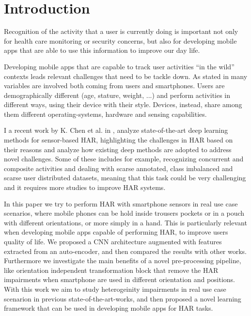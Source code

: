 
\section{Introduction}
\label{sec:introduction}

Recognition of the activity that a user is currently doing is
important not only for health care monitoring or security concerns,
but also for developing mobile apps that are able to use this
information to improve our day life.

Developing mobile apps that are capable to track user activities ``in
the wild'' contexts leads relevant challenges that need to be tackle
down. As stated in \cite{blunck2013heterogeneity} many variables are
involved both coming from users and smartphones. Users are
demographically different (age, stature, weight, ...) and perform
activities in different ways, using their device with their
style. Devices, instead, share among them different operating-systems,
hardware and sensing capabilities.

I a recent work by K. Chen et al. in \cite{chen2020deep}, analyze state-of-the-art
deep learning methods for sensor-based HAR, highlighting the
challenges in HAR based on their reasons and analyze how existing deep
methods are adopted to address novel challenges. Some of these
includes for example, recognizing concurrent and composite activities
and dealing with scarse annotated, class imbalanced and scarse user
distributed datasets, meaning that this task could be very challenging
and it requires more studies to improve HAR systems.

In this paper we try to perform HAR with smartphone sensors in real
use case scenarios, where mobile phones can be hold inside trousers
pockets or in a pouch with different orientations, or more simply in a
hand. This is particularly relevant when developing mobile apps
capable of performing HAR, to improve users quality of life. We
proposed a CNN architecture augmented with features extracted from an
auto-encoder, and then compared the results with other
works. Furthermore we investigate the main benefits of a novel
pre-processing pipeline, like orientation independent transformation
block that remove the HAR impairments when smartphone are used in
different orientation and positions. With this work we aim to study
heterogeinity impairments in real use case scenarion in previous
state-of-the-art-works, and then proposed a novel learning framework
that can be used in developing mobile apps for HAR tasks.

